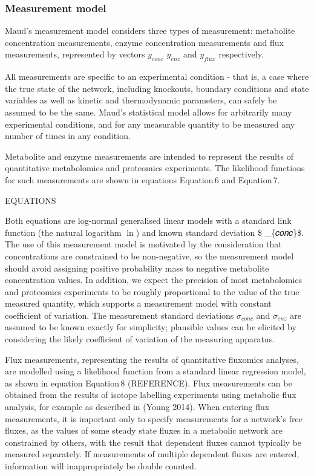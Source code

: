 \documentclass[
  letterpaper,
  DIV=11,
  numbers=noendperiod]{scrartcl}
\begin{document}
\hypertarget{measurement-model-1}{%
\subsubsection{Measurement model}\label{measurement-model-1}}

Maud's measurement model considers three types of measurement:
metabolite concentration measurements, enzyme concentration measurements
and flux measurements, represented by vectors \(𝑦_{𝑐𝑜𝑛𝑐}\) \(𝑦_{𝑒𝑛𝑧}\)
and \(𝑦_{𝑓𝑙𝑢𝑥}\) respectively.

All measurements are specific to an experimental condition - that is, a
case where the true state of the network, including knockouts, boundary
conditions and state variables as well as kinetic and thermodynamic
parameters, can safely be assumed to be the same. Maud's statistical
model allows for arbitrarily many experimental conditions, and for any
measurable quantity to be measured any number of times in any condition.

Metabolite and enzyme measurements are intended to represent the results
of quantitative metabolomics and proteomics experiments. The likelihood
functions for such measurements are shown in equations Equation\,6 and
Equation\,7.

EQUATIONS

Both equations are log-normal generalised linear models with a standard
link function (the natural logarithm \(\ln\)) and known standard
deviation \$ \sigma\_\{𝑐𝑜𝑛𝑐\}\$. The use of this measurement model is
motivated by the consideration that concentrations are constrained to be
non-negative, so the measurement model should avoid assigning positive
probability mass to negative metabolite concentration values. In
addition, we expect the precision of most metabolomics and proteomics
experiments to be roughly proportional to the value of the true measured
quantity, which supports a measurement model with constant coefficient
of variation. The measurement standard deviations \(\sigma_{𝑐𝑜𝑛𝑐}\) and
\(\sigma_{𝑒𝑛𝑧}\) are assumed to be known exactly for simplicity;
plausible values can be elicited by considering the likely coefficient
of variation of the measuring apparatus.

Flux measurements, representing the results of quantitative fluxomics
analyses, are modelled using a likelihood function from a standard
linear regression model, as shown in equation Equation\,8 (REFERENCE).
Flux measurements can be obtained from the results of isotope labelling
experiments using metabolic flux analysis, for example as described in
(Young 2014). When entering flux measurements, it is important only to
specify measurements for a network's free fluxes, as the values of some
steady state fluxes in a metabolic network are constrained by others,
with the result that dependent fluxes cannot typically be measured
separately. If measurements of multiple dependent fluxes are entered,
information will inappropriately be double counted.
\end{document}
